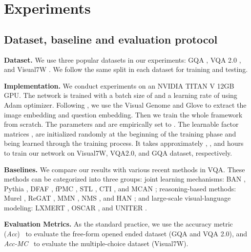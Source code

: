 \documentclass[10pt,twocolumn,letterpaper]{article}
\begin{document}
\section{Experiments}
\label{sec:exp}
\subsection{Dataset, baseline and evaluation protocol}
\textbf{Dataset.} We use three popular datasets in our experiments: GQA  \cite{hudson2019gqa}, VQA 2.0 \cite{vqav22016}, and Visual7W  \cite{zhu2016visual7w} . We follow the same split in each dataset for training and testing.

\textbf{Implementation.}
\label{subsec:implement}
We conduct experiments on an NVIDIA TITAN V 12GB GPU. The network is trained with a batch size of  and a learning rate of  using Adam optimizer. Following \cite{Kim2018BilinearAN, kim2020hypergraph,tip-trick,Yang2016StackedAN}, we use the Visual Genome \cite{visualgenome} and Glove \cite{pennington2014glove} to extract the image embedding and question embedding. Then we train the whole framework from scratch. The parameters  and  are empirically set to . The learnable factor matrices ,  are initialized randomly at the beginning of the training phase and being learned through the training process. It takes approximately , , and  hours to train our network on Visual7W, VQA2.0, and GQA dataset, respectively. 

\textbf{Baselines.} We compare our results with various recent methods in VQA. These methods can be categorized into three groups: joint learning mechanisms: BAN \cite{Kim2018BilinearAN}, Pythia \cite{Jiang2018PythiaVT}, DFAF \cite{gao2019DFAF}, fPMC \cite{hu2018learningfPMC}, STL \cite{wang2018structuredSTL}, CTI \cite{do2019cti}, and MCAN \cite{yu2019mcan}; reasoning-based methods: Murel \cite{cadene2019murel}, ReGAT \cite{li2019regat}, MMN \cite{chen2021meta}, NMS \cite{Hudson2019LearningBA}, and HAN \cite{kim2020hypergraph}; and large-scale visual-language modeling: LXMERT \cite{tan2019lxmert}, OSCAR \cite{li2020oscar}, and UNITER \cite{chen2020uniter}. 

\textbf{Evaluation Metrics.} 
As the standard practice, we use the accuracy metric (\textit{Acc})~\cite{VQA} to evaluate the free-form opened ended dataset (GQA and VQA 2.0), and  \textit{Acc-MC}~\cite{zhu2016visual7w} to evaluate the multiple-choice dataset (Visual7W).
\end{document}

